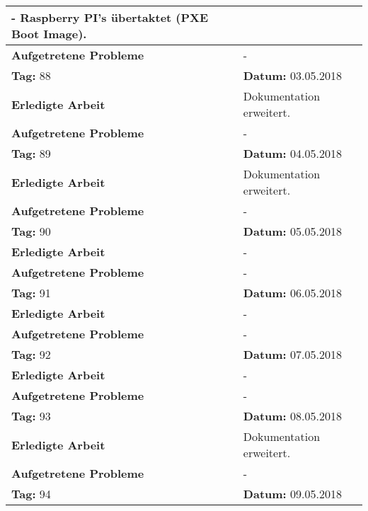 \begin{longtable}{|p{5cm}|p{5cm}p{6cm}|}
{- Raspberry PI's übertaktet (PXE Boot Image).} \\ \hline
\textbf{Aufgetretene Probleme} & \multicolumn{2}{p{11cm}|}{-} \\ \hline
\rowcolor{heading}\textbf{Tag:} 88 & \textbf{Datum:} 03.05.2018 & \\ \hline
\textbf{Erledigte Arbeit} & \multicolumn{2}{p{11cm}|}{Dokumentation erweitert.} \\ \hline
\textbf{Aufgetretene Probleme} & \multicolumn{2}{p{11cm}|}{-} \\ \hline
\rowcolor{heading}\textbf{Tag:} 89 & \textbf{Datum:} 04.05.2018 & \\ \hline
\textbf{Erledigte Arbeit} & \multicolumn{2}{p{11cm}|}{Dokumentation erweitert.} \\ \hline
\textbf{Aufgetretene Probleme \newline \newline \newline \newline \newline } & \multicolumn{2}{p{11cm}|}{-} \\ \hline
\rowcolor{heading}\textbf{Tag:} 90 & \textbf{Datum:} 05.05.2018 & \\ \hline
\textbf{Erledigte Arbeit} & \multicolumn{2}{p{11cm}|}{-} \\ \hline
\textbf{Aufgetretene Probleme } & \multicolumn{2}{p{11cm}|}{-} \\ \hline
\rowcolor{heading}\textbf{Tag:} 91 & \textbf{Datum:} 06.05.2018 & \\ \hline
\textbf{Erledigte Arbeit} & \multicolumn{2}{p{11cm}|}{-} \\ \hline
\textbf{Aufgetretene Probleme} & \multicolumn{2}{p{11cm}|}{-} \\ \hline
\rowcolor{heading}\textbf{Tag:} 92 & \textbf{Datum:} 07.05.2018 & \\ \hline
\textbf{Erledigte Arbeit} & \multicolumn{2}{p{11cm}|}{-} \\ \hline
\textbf{Aufgetretene Probleme} & \multicolumn{2}{p{11cm}|}{-} \\ \hline
\rowcolor{heading}\textbf{Tag:} 93 & \textbf{Datum:} 08.05.2018 & \\ \hline
\textbf{Erledigte Arbeit} & \multicolumn{2}{p{11cm}|}{Dokumentation erweitert.} \\ \hline
\textbf{Aufgetretene Probleme} & \multicolumn{2}{p{11cm}|}{-} \\ \hline
\rowcolor{heading}\textbf{Tag:} 94 & \textbf{Datum:} 09.05.2018 & \\ \hline

\end{longtable}

